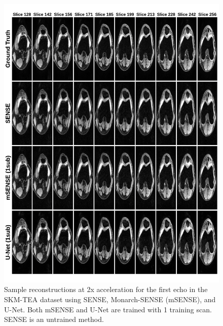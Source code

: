 \begin{figure}
    \centering
    \includegraphics[width=0.9\linewidth]{figures/sample-mri-echo1.pdf}
    \vspace{-1em}
    \caption{Sample reconstructions at 2x acceleration for the first echo in the SKM-TEA dataset using SENSE, Monarch-SENSE (mSENSE), and U-Net. Both mSENSE and U-Net are trained with 1 training scan. SENSE is an untrained method.}
    \label{fig:mri-data-limited-echo1}
\end{figure}

